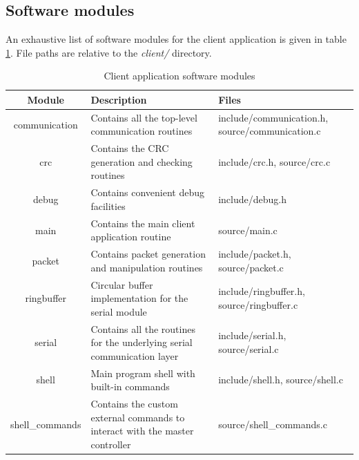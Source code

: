 \documentclass[binding=0.6cm,Lau]{sapthesis}
\begin{document}
\subsection{Software modules}
An exhaustive list of software modules for the client application is given
in table \ref{tab:client-spec-modules}. File paths are relative to the
\emph{client/} directory.

\begin{table}[bh]
  \begin{tabularx}{\textwidth}{c X X}
    \toprule
    Module & Description & Files \\
    \midrule
    communication &
      Contains all the top-level communication routines &
      include/communication.h, source/communication.c \\
    crc &
      Contains the CRC generation and checking routines &
      include/crc.h, source/crc.c \\
    debug &
      Contains convenient debug facilities &
      include/debug.h \\
    main &
      Contains the main client application routine &
      source/main.c \\
    packet &
      Contains packet generation and manipulation routines &
      include/packet.h, source/packet.c \\
    ringbuffer &
      Circular buffer implementation for the serial module &
      include/ringbuffer.h, source/ringbuffer.c \\
    serial &
      Contains all the routines for the underlying serial communication layer &
      include/serial.h, source/serial.c \\
    shell &
      Main program shell with built-in commands &
      include/shell.h, source/shell.c \\
    shell\_commands &
      Contains the custom external commands to interact with the master controller &
      source/shell\_commands.c \\
    \bottomrule
  \end{tabularx}
  \caption{Client application software modules}
  \label{tab:client-spec-modules}
\end{table}
\end{document}
